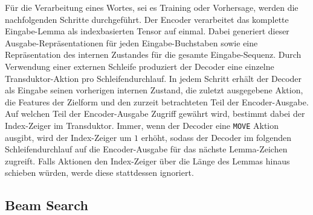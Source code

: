 \documentclass[11pt,a4paper]{article}
\newcommand{\action}[1]{\texttt{#1}}
\begin{document}
Für die Verarbeitung eines Wortes, sei es Training oder Vorhersage, werden die nachfolgenden Schritte durchgeführt.
Der Encoder verarbeitet das komplette Eingabe-Lemma als indexbasierten Tensor auf einmal. Dabei generiert dieser Ausgabe-Repräsentationen für jeden Eingabe-Buchstaben sowie eine Repräsentation des internen Zustandes für die gesamte Eingabe-Sequenz.
Durch Verwendung einer externen Schleife produziert der Decoder eine einzelne Transduktor-Aktion pro Schleifendurchlauf.
In jedem Schritt erhält der Decoder als Eingabe seinen vorherigen internen Zustand, die zuletzt ausgegebene Aktion, die Features der Zielform und den zurzeit betrachteten Teil der Encoder-Ausgabe. Auf welchen Teil der Encoder-Ausgabe Zugriff gewährt wird, bestimmt dabei der Index-Zeiger im Transduktor.
Immer, wenn der Decoder eine \action{MOVE} Aktion ausgibt, wird der Index-Zeiger um $1$ erhöht, sodass der Decoder im folgenden Schleifendurchlauf auf die Encoder-Ausgabe für das nächste Lemma-Zeichen zugreift.
Falls Aktionen den Index-Zeiger über die Länge des Lemmas hinaus schieben würden, werde diese stattdessen ignoriert.

\subsection{Beam Search}

\end{document}
